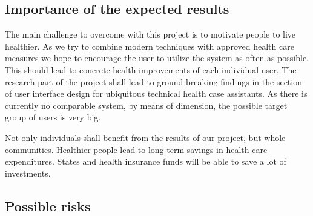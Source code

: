 \documentclass[a4paper,11pt]{article}
\providecommand*{\note}[1]{\small \textcolor{RoyalBlue}{\begin{minipage}{\textwidth}{#1}\end{minipage}}}
\begin{document}

\subsection{Importance of the expected results}

The main challenge to overcome with this project is to motivate people to live healthier. As we try to combine modern techniques with approved health care measures we hope to encourage the user to utilize the system as often as possible. This should lead to concrete health improvements of each individual user. The research part of the project shall lead to ground-breaking findings in the section of user interface design for ubiquitous technical health case assistants.
As there is currently no comparable system, by means of dimension, the possible target group of users is very big.

Not only individuals shall benefit from the results of our project, but whole communities. Healthier people lead to long-term savings in health care expenditures. States and health insurance funds will be able to save a lot of investments.

\subsection{Possible risks}
\end{document}
